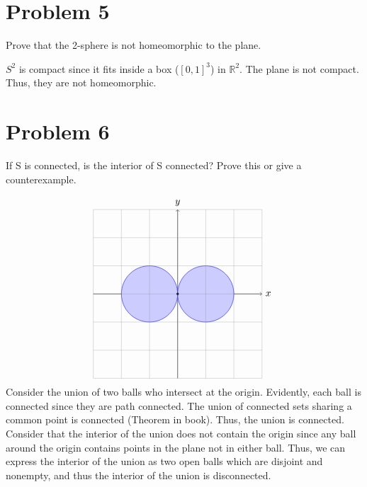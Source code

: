 \documentclass[11pt]{article}
\newcommand{\bbR}{\mathbb{R}}
\begin{document}
\newpage
\section*{Problem 5}
\begin{problem}
    Prove that the 2-sphere is not homeomorphic to the plane.
\end{problem}
\begin{solution}
    $S^2$ is compact since it fits inside a box ($[0,1]^3$) in $\bbR^2.$ The plane is not compact. Thus, they are not homeomorphic.
\end{solution}

\newpage
\section*{Problem 6}
\begin{problem}
     If S is connected, is the interior of S connected? Prove this or give a counterexample.
\end{problem}
\begin{solution}
\[
\begin{tikzpicture}
    \draw[->] (-3,0) -- (3,0) node[right] {$x$};
    \draw[->] (0,-3) -- (0,3) node[above] {$y$};
    
    \filldraw[fill=blue!20, draw=blue] (1,0) circle (1);
    
    \filldraw[fill=blue!20, draw=blue] (-1,0) circle (1);
    
    \filldraw (0,0) circle (1pt);
    
    \draw[step=1cm, gray, very thin] (-3,-3) grid (3,3);

\end{tikzpicture}\] Consider the union of two balls who intersect at the origin. Evidently, each ball is connected since they are path connected. The union of connected sets sharing a common point is connected (Theorem in book). Thus, the union is connected. Consider that the interior of the union does not contain the origin since any ball around the origin contains points in the plane not in either ball. Thus, we can express the interior of the union as two open balls which are disjoint and nonempty, and thus the interior of the union is disconnected. 
\end{solution}
\end{document}
